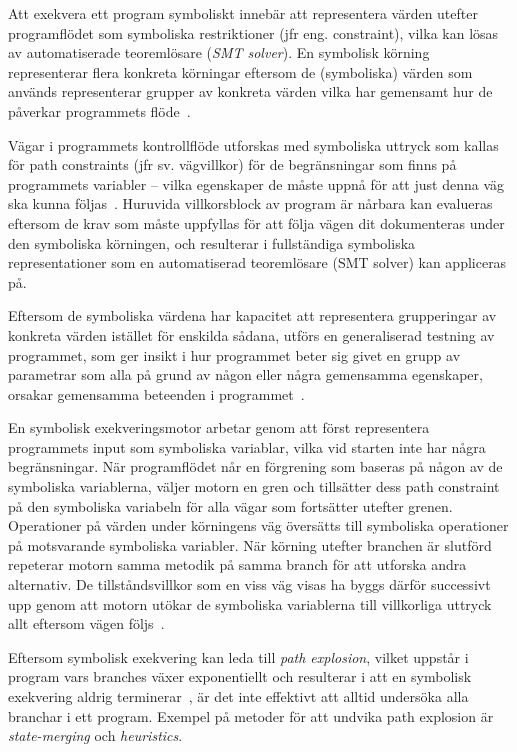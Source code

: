 Att exekvera ett program symboliskt innebär att representera värden utefter
programflödet som symboliska restriktioner (jfr eng. constraint), vilka kan
lösas av automatiserade teoremlösare (\emph{SMT solver}). En symbolisk körning
representerar flera konkreta körningar eftersom de (symboliska) värden som
används representerar grupper av konkreta värden vilka har gemensamt hur de
påverkar programmets flöde~\cite{klee}. 

Vägar i programmets kontrollflöde utforskas med symboliska uttryck som kallas
för path constraints (jfr sv. vägvillkor) för de begränsningar som finns på
programmets variabler -- vilka egenskaper de måste uppnå för att just denna väg
ska kunna följas~\cite{klee}. Huruvida villkorsblock av program är nårbara kan 
evalueras eftersom de krav som måste uppfyllas för att följa vägen dit dokumenteras 
under den symboliska körningen, och resulterar i fullständiga symboliska representationer 
som en automatiserad teoremlösare (SMT solver) kan appliceras på.

Eftersom de symboliska värdena har kapacitet att representera grupperingar av konkreta 
värden istället för enskilda sådana, utförs en generaliserad testning av programmet, 
som ger insikt i hur programmet beter sig givet en grupp av parametrar som alla 
på grund av någon eller några gemensamma egenskaper, orsakar gemensamma beteenden 
i programmet~\cite{cadar}.

En symbolisk exekveringsmotor arbetar genom att först representera programmets
input som symboliska variablar, vilka vid starten inte har några begränsningar.
När programflödet når en förgrening som baseras på någon av de symboliska
variablerna, väljer motorn en gren och tillsätter dess path constraint på den
symboliska variabeln för alla vägar som fortsätter utefter grenen. Operationer
på värden under körningens väg översätts till symboliska operationer på
motsvarande symboliska variabler. När körning utefter branchen är
slutförd repeterar motorn samma metodik på samma branch för att utforska andra
alternativ. De tillståndsvillkor som en viss väg visas ha byggs därför
successivt upp genom att motorn utökar de symboliska variablerna till
villkorliga uttryck allt eftersom vägen följs~\cite{klee}.  

Eftersom symbolisk exekvering kan leda till \emph{path explosion}, vilket
uppstår i program vars branches växer exponentiellt och resulterar i att en
symbolisk exekvering aldrig terminerar~\cite{path_explo}, är det inte effektivt
att alltid undersöka alla branchar i ett program. Exempel på metoder för att
undvika path explosion är \emph{state-merging} och \emph{heuristics}. 

